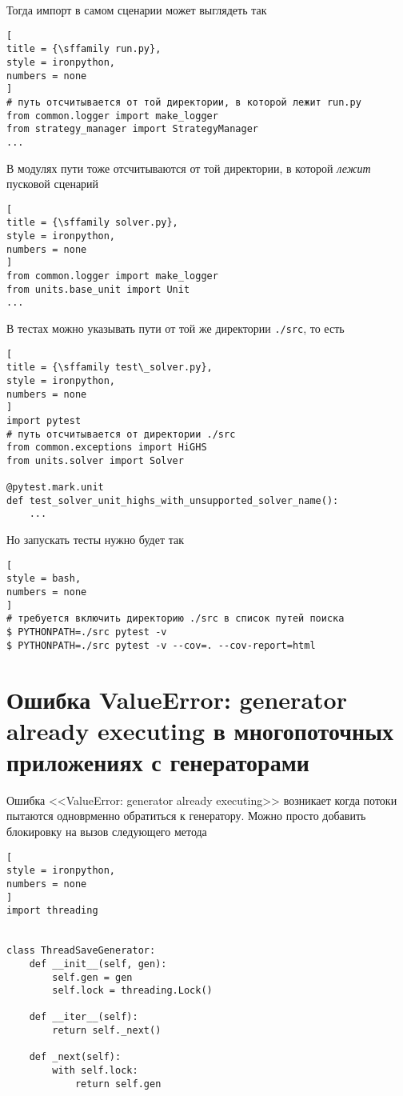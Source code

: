 \documentclass[%
	11pt,
	a4paper,
	utf8,
		]{article}
\begin{document}
Тогда импорт в самом сценарии может выглядеть так
\begin{lstlisting}[
title = {\sffamily run.py},
style = ironpython,
numbers = none
]
# путь отсчитывается от той директории, в которой лежит run.py
from common.logger import make_logger
from strategy_manager import StrategyManager
...
\end{lstlisting}

В модулях пути тоже отсчитываются от той директории, в которой \emph{лежит} пусковой сценарий
\begin{lstlisting}[
title = {\sffamily solver.py},
style = ironpython,
numbers = none
]
from common.logger import make_logger
from units.base_unit import Unit
...
\end{lstlisting}

В тестах можно указывать пути от той же директории \verb|./src|, то есть
\begin{lstlisting}[
title = {\sffamily test\_solver.py},
style = ironpython,
numbers = none
]
import pytest
# путь отсчитывается от директории ./src
from common.exceptions import HiGHS
from units.solver import Solver

@pytest.mark.unit
def test_solver_unit_highs_with_unsupported_solver_name():
    ...
\end{lstlisting}

Но запускать тесты нужно будет так
\begin{lstlisting}[
style = bash,
numbers = none
]
# требуется включить директорию ./src в список путей поиска
$ PYTHONPATH=./src pytest -v
$ PYTHONPATH=./src pytest -v --cov=. --cov-report=html
\end{lstlisting}

\section{Ошибка ValueError: generator already executing в многопоточных приложениях с генераторами}

Ошибка <<ValueError: generator already executing>> возникает когда потоки пытаются одноврменно обратиться к генератору. Можно просто добавить блокировку на вызов следующего метода
\begin{lstlisting}[
style = ironpython,
numbers = none
]
import threading


class ThreadSaveGenerator:
	def __init__(self, gen):
		self.gen = gen
		self.lock = threading.Lock()
	
	def __iter__(self):
		return self._next()
	
	def _next(self):
		with self.lock:
			return self.gen
\end{lstlisting}
\end{document}

